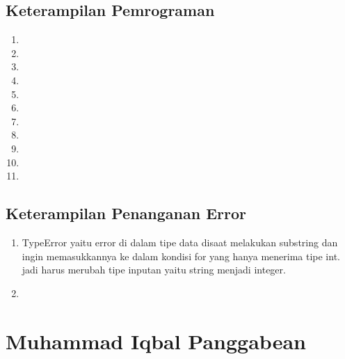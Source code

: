 \subsection{Keterampilan Pemrograman}
\begin{enumerate}
	\item 

	\item 

	\item 

	\item 

	\item 

	\item 

	\item 

	\item 

	\item 

	\item 
	
	\item 
\end{enumerate}
\subsection{Keterampilan Penanganan Error}
\begin{enumerate}
	\item TypeError yaitu error di dalam tipe data disaat melakukan substring dan ingin memasukkannya ke dalam kondisi for 
	yang hanya menerima tipe int. jadi harus merubah tipe inputan yaitu string menjadi integer.

	\item 
\end{enumerate}

 \section{Muhammad Iqbal Panggabean}
